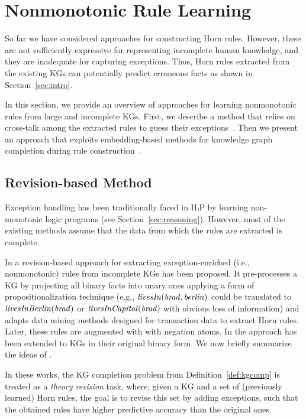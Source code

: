 \section{Nonmonotonic Rule Learning}\label{sec:nmrulelearn}
So far we have considered approaches for constructing Horn rules. However,  these are not sufficiently expressive for representing incomplete human knowledge, and they are inadequate for capturing
exceptions. Thus, Horn rules extracted from the existing KGs can potentially %
predict erroneous facts as shown in Section~\ref{sec:intro}. 

In this section, we provide an overview of approaches for learning nonmonotonic rules from large and incomplete KGs. First, we describe a method that relies on cross-talk among the extracted rules to guess their exceptions~\cite{gad2016,rumis}. Then we present an approach that exploits embedding-based methods for knowledge graph completion during rule construction~\cite{thinh2018}.

\subsection{Revision-based Method}
Exception handling has been traditionally faced in ILP by learning non-monotonic logic programs \cite{DBLP:conf/ijcai/InoueK97,DBLP:journals/tocl/Sakama05,XHAIL,CorapiRL10,ILASP_system} (see Section~\ref{sec:reasoning}). However, most of the existing methods assume that the data from which the rules are extracted is complete.

In \cite{gad2016} a revision-based approach for extracting exception-enriched (i.e., nonmonotonic) rules from incomplete KGs has been proposed. 
It pre-processes a KG by %
projecting all binary facts into unary ones applying a form of propositionalization technique \cite{propos} (e.g., $\mathit{livesIn(brad,berlin)}$ could be translated to $\mathit{livesInBerlin(brad)}$ or $\mathit{livesInCapital(brad)}$ with obvious loss of information) and adapts data mining methods designed for transaction data to extract Horn rules. Later, these rules are augmented with 
with negation atoms. In \cite{rumis} the approach has been extended to KGs in their original binary form. We now briefly summarize the ideas of  \cite{gad2016,rumis}.

In these works, the KG completion problem from Definition~\ref{def:kgcomp} is treated 
as a \emph{theory revision} task, where, given a KG and a set of (previously learned) Horn rules, the goal is to revise this set by adding exceptions, such that the obtained rules have higher predictive accuracy than the original ones. 

